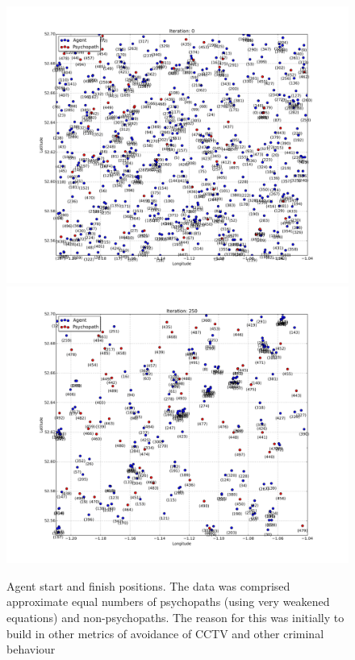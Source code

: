 \documentclass[conference]{IEEEtran}
\begin{document}
\begin{figure}[!htp]
\centering
\includegraphics[width=\columnwidth]{images/Step_0_sim_11.png}
\includegraphics[width=\columnwidth]{images/Step_250_sim_11.png}
\caption{Agent start and finish positions. The data was comprised
  approximate equal numbers of psychopaths (using very weakened
  equations) and non-psychopaths. The reason for this was initially to
  build in other metrics of avoidance of CCTV and other criminal
  behaviour}
\label{fig:agentstartandfinish}
\end{figure}
\end{document}
